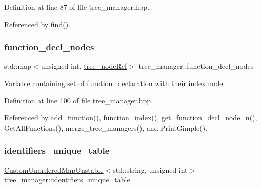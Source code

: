 Definition at line 87 of file tree\+\_\+manager.\+hpp.



Referenced by find().

\mbox{\label{classtree__manager_af8a44833d20aa181fefc0f681f08cc16}} 
\subsubsection{\texorpdfstring{function\+\_\+decl\+\_\+nodes}{function\_decl\_nodes}}
{\footnotesize\ttfamily std\+::map$<$unsigned int, \hyperlink{tree__node_8hpp_a6ee377554d1c4871ad66a337eaa67fd5}{tree\+\_\+node\+Ref}$>$ tree\+\_\+manager\+::function\+\_\+decl\+\_\+nodes\hspace{0.3cm}{\ttfamily [private]}}



Variable containing set of function\+\_\+declaration with their index node. 



Definition at line 100 of file tree\+\_\+manager.\+hpp.



Referenced by add\+\_\+function(), function\+\_\+index(), get\+\_\+function\+\_\+decl\+\_\+node\+\_\+n(), Get\+All\+Functions(), merge\+\_\+tree\+\_\+managers(), and Print\+Gimple().

\mbox{\label{classtree__manager_a44fd592db00c4a45e1c8d6fdd7a0a7b4}} 
\subsubsection{\texorpdfstring{identifiers\+\_\+unique\+\_\+table}{identifiers\_unique\_table}}
{\footnotesize\ttfamily \hyperlink{custom__map_8hpp_a8cbaceffc09790a885ec7e9c17809c69}{Custom\+Unordered\+Map\+Unstable}$<$std\+::string, unsigned int$>$ tree\+\_\+manager\+::identifiers\+\_\+unique\+\_\+table\hspace{0.3cm}{\ttfamily [private]}}



